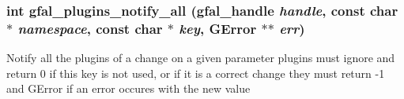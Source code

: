 \subsubsection{\setlength{\rightskip}{0pt plus 5cm}int gfal\_\-plugins\_\-notify\_\-all (gfal\_\-handle {\em handle}, const char $\ast$ {\em namespace}, const char $\ast$ {\em key}, GError $\ast$$\ast$ {\em err})}\label{gfal__common__plugin_8h_4594ecd9436c82f11317d0a3a2672c0b}


Notify all the plugins of a change on a given parameter plugins must ignore and return 0 if this key is not used, or if it is a correct change they must return -1 and GError if an error occures with the new value 
